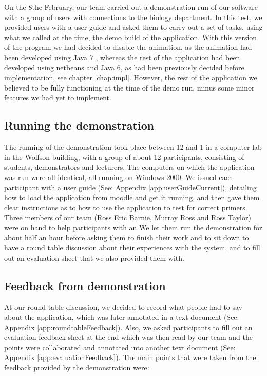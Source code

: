 On the 8the February, our team carried out a demonstration run of our software with a group of users with connections to the biology department. In this test, we provided users with a user guide and asked them to carry out a set of tasks, using what we called at the time, the demo build of the application. With this version of the program we had decided to disable the animation, as the animation had been developed using Java 7 \cite{Java7SwingAPI}, whereas the rest of the application had been developed using netbeans and Java 6, as had been previously decided before implementation, see chapter \ref{chap:impl}. However, the rest of the application we believed to be fully functioning at the time of the demo run, minus some minor features we had yet to implement.

\subsection{Running the demonstration}

The running of the demonstration took place between 12 and 1 in a computer lab in the Wolfson building, with a group of about 12 participants, consisting of students, demonstrators and lecturers. The computers on which the application was run were all identical, all running on Windows 2000. We issued each participant with a user guide (See: Appendix \ref{app:userGuideCurrent}), detailing how to load the application from moodle and get it running, and then gave them clear instructions as to how to use the application to test for correct primers. Three members of our team (Ross Eric Barnie, Murray Ross and Ross Taylor) were on hand to help participants with an We let them run the demonstration for about half an hour before asking them to finish their work and to sit down to have a round table discussion about their experiences with the system, and to fill out an evaluation sheet that we also provided them with.

\subsection{Feedback from demonstration}

At our round table discussion, we decided to record what people had to say about the application, which was later annotated in a text document (See: Appendix \ref{app:roundtableFeedback}). Also, we asked participants to fill out an evaluation feedback sheet at the end which was then read by our team and the points were collaborated and annotated into another text document (See: Appendix \ref{app:evaluationFeedback}). The main points that were taken from the feedback provided by the demonstration were:

